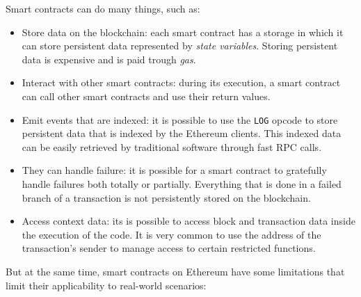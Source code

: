 Smart contracts can do many things, such as:

\begin{itemize}
    \item Store data on the blockchain: each smart contract has a storage in which it can store persistent data represented by \textit{state variables}. Storing persistent data is expensive and is paid trough \textit{gas}.
    \item Interact with other smart contracts: during its execution, a smart contract can call other smart contracts and use their return values.
    \item Emit events that are indexed: it is possible to use the \lstinline{LOG} opcode to store persistent data that is indexed by the Ethereum clients. This indexed data can be easily retrieved by traditional software through fast RPC calls. 
    \item They can handle failure: it is possible for a smart contract to gratefully handle failures both totally or partially. Everything that is done in a failed branch of a transaction is not persistently stored on the blockchain.
    \item Access context data: its is possible to access block and transaction data inside the execution of the code. It is very common to use the address of the transaction's sender to manage access to certain restricted functions.
\end{itemize}

But at the same time, smart contracts on Ethereum have some limitations that limit their applicability to real-world scenarios:


